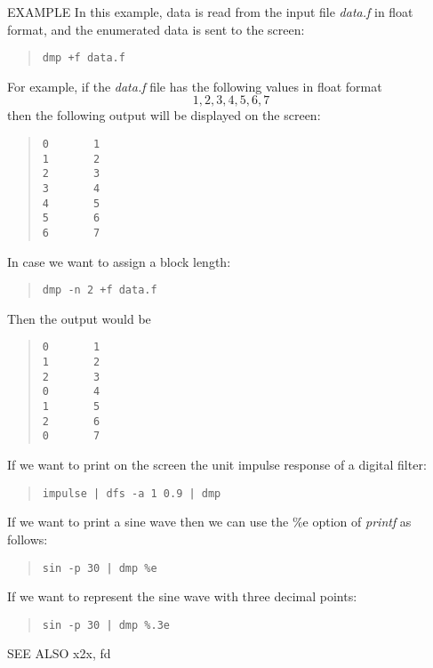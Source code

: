 \begin{qsection}{EXAMPLE}
In this example, data is read from the input file
{\em data.f} in float format, and the enumerated data is sent
to the screen:
\begin{quote}
 \verb!dmp +f data.f!
\end{quote}
For example, if the {\em data.f} file has the following values
in float format
\begin{displaymath}
  1, 2, 3, 4, 5, 6, 7
\end{displaymath}
then the following output will be displayed on the screen:
\begin{quote}
  \verb!0       1! \\
  \verb!1       2! \\
  \verb!2       3! \\
  \verb!3       4! \\
  \verb!4       5! \\
  \verb!5       6! \\
  \verb!6       7!
\end{quote}
\par
In case we want to assign a block length:
\begin{quote}
 \verb!dmp -n 2 +f data.f!
\end{quote}
Then the output would be
\begin{quote}
  \verb!0       1! \\
  \verb!1       2! \\
  \verb!2       3! \\
  \verb!0       4! \\
  \verb!1       5! \\
  \verb!2       6! \\
  \verb!0       7!
\end{quote}
\par
If we want to print on the screen the unit impulse response of a digital
filter:
\begin{quote}
  \verb!impulse | dfs -a 1 0.9 | dmp!
\end{quote}
\par
If we want to print a sine wave then we can use the \%e option of
{\em printf} as follows:
\begin{quote}
  \verb!sin -p 30 | dmp %e!
\end{quote}
\par
If we want to represent the sine wave with three decimal points:
\begin{quote}
  \verb!sin -p 30 | dmp %.3e!
\end{quote}
\end{qsection}

\begin{qsection}{SEE ALSO}
x2x, fd
\end{qsection}
